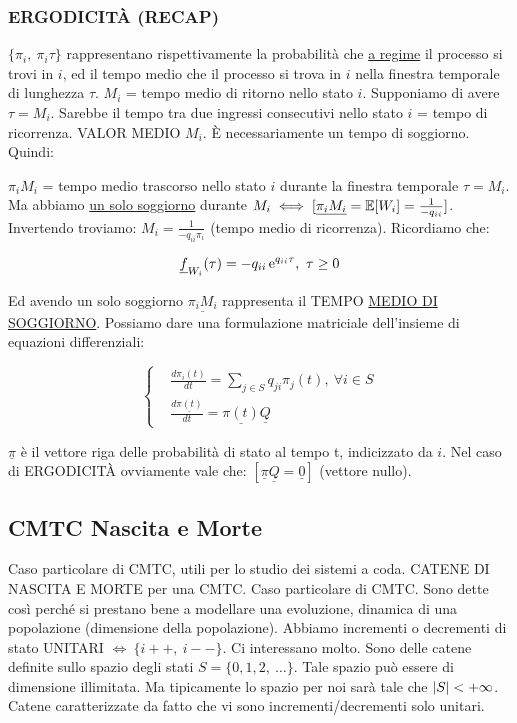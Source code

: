 \subsubsection{ERGODICIT\`A (RECAP)}

$\{\pi_i,\ \pi_i\tau\}$ rappresentano rispettivamente la probabilità che \underline{a regime} il processo si trovi in $i$, ed il tempo medio che il processo si trova in $i$ nella finestra temporale di lunghezza $\tau$. $M_i$ = tempo medio di ritorno nello stato $i$. Supponiamo di avere $\tau = M_i$. Sarebbe il tempo tra due ingressi consecutivi nello stato $i$ = tempo di ricorrenza. VALOR MEDIO $M_i$. \`E necessariamente un tempo di soggiorno. Quindi: 

$\pi_iM_i$ = tempo medio trascorso nello stato $i$ durante la finestra temporale $\tau = M_i$. Ma abbiamo \underline{un solo soggiorno} durante $M_i \iff [\underline{\pi_iM_i} = \operatorname{\mathbb{E}}[W_i] = \frac{1}{-q_{ii}}]$. Invertendo troviamo: $M_i = \frac{1}{-q_{ii}\pi_i}$ (tempo medio di ricorrenza). Ricordiamo che:

\[
	\underline{f}_{W_i}(\tau) = -q_{ii}\mathop{}\!\mathrm{e}^{q_{ii}\tau},\ \tau\geq 0
\]

Ed avendo un solo soggiorno $\underline{\pi_iM_i}$ rappresenta il TEMPO \underline{MEDIO DI SOGGIORNO}. Possiamo dare una formulazione matriciale dell'insieme di equazioni differenziali:

\[
	\left\{
	\begin{aligned}
	&\frac{d \pi_i(t)}{dt} = \sum_{j\in S}{q_{ji}\pi_j(t)},\ \forall i\in S\\
	&\frac{d \underline{\pi(t)}}{dt} = \underline{\pi(t)}\underline{Q}
	\end{aligned}
	\right.
\]

$\underline{\pi}$ è il vettore riga delle probabilità di stato al tempo t, indicizzato da $i$. Nel caso di ERGODICIT\`A ovviamente vale che: $[\underline{\pi}\underline{Q} = \underline{0}]$ (vettore nullo).

\subsection{CMTC Nascita e Morte}

Caso particolare di CMTC, utili per lo studio dei sistemi a coda. CATENE DI NASCITA E MORTE per una CMTC. Caso particolare di CMTC. Sono dette così perché si prestano bene a modellare una evoluzione, dinamica di una popolazione (dimensione della popolazione). Abbiamo incrementi o decrementi di stato UNITARI $\iff\ \{i++,\ i--\}$. Ci interessano molto. Sono delle catene definite sullo spazio degli stati $S = \{0,1,2,\ \dots\}$. Tale spazio può essere di dimensione illimitata. Ma tipicamente lo spazio per noi sarà tale che $\left\vert{S}\right\vert < +\infty$. Catene caratterizzate da fatto che vi sono incrementi/decrementi solo unitari.

